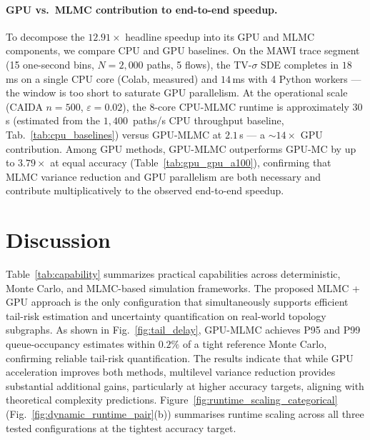 \documentclass[pdflatex,sn-mathphys-num]{sn-jnl}
\theoremstyle{thmstyleone}%
\theoremstyle{thmstyletwo}%
\theoremstyle{thmstylethree}%
\begin{document}
\paragraph{GPU vs.\ MLMC contribution to end-to-end speedup.}
To decompose the $12.91\times$ headline speedup into its GPU and MLMC components, we compare
CPU and GPU baselines. On the MAWI trace segment (15 one-second bins, $N{=}2{,}000$ paths,
5 flows), the TV-$\sigma$ SDE completes in $18$\,ms on a single CPU core (Colab, measured)
and $14$\,ms with 4 Python workers — the window is too short to saturate GPU parallelism. At the operational
scale (CAIDA $n{=}500$, $\varepsilon{=}0.02$), the 8-core CPU-MLMC runtime is approximately
$30$\,s (estimated from the $1{,}400$~paths/s CPU throughput baseline,
Tab.~\ref{tab:cpu_baselines}) versus GPU-MLMC at $2.1$\,s — a $\sim\!14\times$ GPU
contribution. Among GPU methods, GPU-MLMC outperforms GPU-MC by up to $3.79\times$ at equal
accuracy (Table~\ref{tab:gpu_gpu_a100}), confirming that MLMC variance reduction and GPU
parallelism are both necessary and contribute multiplicatively to the observed end-to-end
speedup.


\section{Discussion}
\label{sec:discussion}

Table~\ref{tab:capability} summarizes practical capabilities across deterministic, Monte Carlo,
and MLMC-based simulation frameworks. The proposed MLMC + GPU approach is the only configuration
that simultaneously supports efficient tail-risk estimation and uncertainty quantification on
real-world topology subgraphs. As shown in Fig.~\ref{fig:tail_delay}, GPU-MLMC achieves P95 and
P99 queue-occupancy estimates within $0.2\%$ of a tight reference Monte Carlo, confirming
reliable tail-risk quantification. The results indicate that while GPU acceleration improves both
methods, multilevel variance reduction provides substantial additional gains, particularly at
higher accuracy targets, aligning with theoretical complexity predictions.
Figure~\ref{fig:runtime_scaling_categorical} (Fig.~\ref{fig:dynamic_runtime_pair}(b))
summarises runtime scaling across all three tested configurations at the tightest accuracy target.
\end{document}
